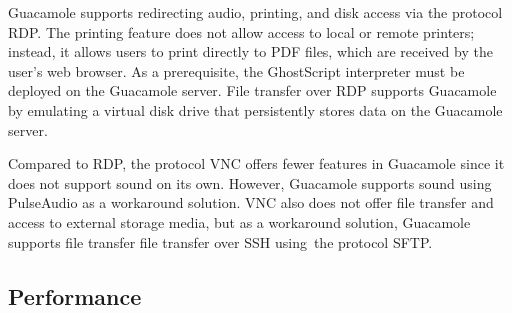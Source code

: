 \documentclass[runningheads]{llncs}
\begin{document}
Guacamole supports redirecting audio, printing, and disk access via the protocol RDP. The printing feature does not allow access to local or remote printers; instead, it allows users to print directly to PDF files, which are received by the user's web browser. As a prerequisite, the GhostScript interpreter must be deployed on the Guacamole server.
File transfer over RDP supports Guacamole by emulating a virtual disk drive that persistently stores data on the Guacamole server.~\cite{ApacheGuacamole2024} 

Compared to RDP, the protocol VNC offers fewer features in Guacamole since it does not support sound on its own. However, Guacamole supports sound using PulseAudio as a workaround solution. VNC also does not offer file transfer and access to external storage media, but as a workaround solution, Guacamole supports file transfer file transfer over SSH using the protocol SFTP.


\subsection{Performance}
%
%
\end{document}
